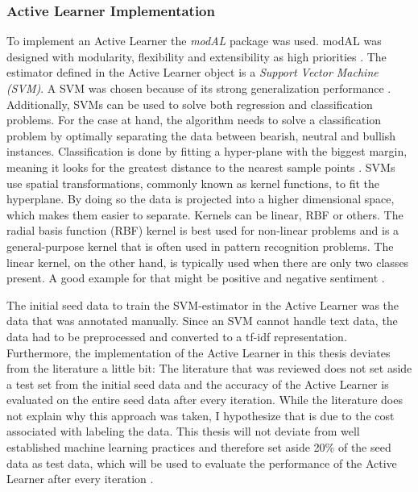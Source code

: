 \documentclass[11pt, a4paper]{article}
\begin{document}
\subsubsection{Active Learner Implementation}
To implement an Active Learner the \emph{modAL} package was used. modAL was designed with modularity, flexibility and extensibility as high priorities \citep{danka2018modal}. 
The estimator defined in the Active Learner object is a \emph{Support Vector Machine (SVM)}. A SVM was chosen because of its strong generalization 
performance \citep{alves2014comparisonsvm}.
Additionally, SVMs can be used to solve both regression and 
classification problems. For the case at hand, the algorithm needs to solve a classification problem by optimally separating the data between bearish, 
neutral and bullish instances. Classification is done by fitting a hyper-plane with the biggest margin, meaning it looks for the greatest distance 
to the nearest sample points \citep{jemai2021SentimentAnalysis}. SVMs use spatial transformations, commonly known as kernel functions, to fit the hyperplane.
By doing so the data is projected into a higher dimensional space, which makes them easier to separate.
Kernels can be linear, RBF or others. The radial basis function (RBF) kernel is best used for non-linear problems and is a general-purpose kernel that 
is often used in pattern recognition problems. The linear kernel, on the other hand, is typically used when there are only two classes present. 
A good example for that might be positive and negative sentiment \citep{alves2014comparisonsvm}.

The initial seed data to train the SVM-estimator in the Active Learner was the data that was annotated manually.
Since an SVM cannot handle text data, the data had to be preprocessed and converted to a tf-idf representation. %
Furthermore, the implementation of the Active Learner in this thesis deviates from the literature a little bit: The literature that was reviewed
does not set aside a test set from the initial seed data and the accuracy of the Active Learner is evaluated on the entire seed data after every iteration. 
While the literature does not explain why this approach was
taken, I hypothesize that is due to the cost associated with labeling the data. This thesis will not deviate from well established machine learning practices
and therefore set aside 20\% of the seed data as test data, which will be used to evaluate the performance of the Active Learner after every iteration \cite[p. 196]{raschka2019pythonmachinelearning}.
\end{document}
